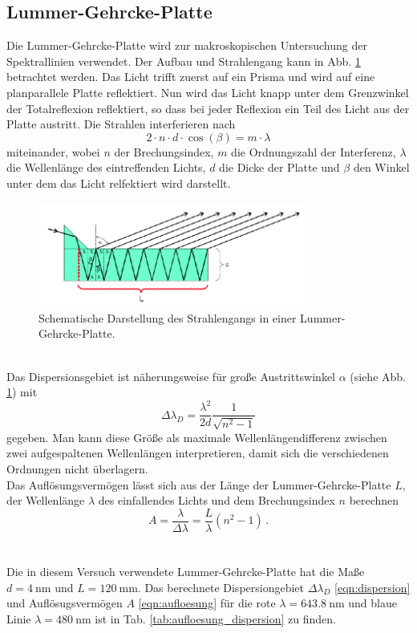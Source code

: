 \subsection{Lummer-Gehrcke-Platte}
Die Lummer-Gehrcke-Platte wird zur makroskopischen Untersuchung der Spektrallinien verwendet.
Der Aufbau und Strahlengang kann in Abb. \ref{fig:lummer} betrachtet werden.
Das Licht trifft zuerst auf ein Prisma und wird auf eine planparallele Platte reflektiert.
Nun wird das Licht knapp unter dem Grenzwinkel der Totalreflexion reflektiert, so dass bei jeder Reflexion ein Teil des Licht aus der Platte austritt.
Die Strahlen interferieren nach
\begin{equation*}
    2 \cdot n \cdot d \cdot \cos (\beta) = m \cdot \lambda
\end{equation*}
miteinander, wobei $n$ der Brechungsindex, $m$ die Ordnungszahl der Interferenz, $\lambda$ die Wellenlänge des eintreffenden Lichts, $d$ die Dicke der Platte und $\beta$ den Winkel unter dem das Licht relfektiert wird darstellt.
\begin{figure}
    \centering
    \includegraphics[width=0.8\textwidth]{content/data/lumer_gehrcke_platte.png}
    \caption{Schematische Darstellung des Strahlengangs in einer Lummer-Gehrcke-Platte. \cite[2]{anleitung}} %
    \label{fig:lummer}
\end{figure}
\\
Das Dispersionsgebiet ist näherungsweise für große Austrittswinkel $\alpha$ (siehe Abb. \ref{fig:lummer}) mit
\begin{equation}
    \Delta \lambda_D = \frac{\lambda^2}{2d} \frac{1}{\sqrt{n^2 -1}}
    \label{eqn:dispersion}
\end{equation}
gegeben.
Man kann diese Größe als maximale Wellenlängendifferenz zwischen zwei aufgespaltenen Wellenlängen interpretieren, damit sich die verschiedenen Ordnungen nicht überlagern.
\\
Das Auflösungsvermögen lässt sich aus der Länge der Lummer-Gehrcke-Platte $L$, der Wellenlänge $\lambda$ des einfallendes Lichts und dem Brechungsindex $n$ berechnen
\begin{equation}
    A = \frac{\lambda}{\Delta \lambda} = \frac{L}{\lambda} (n^2 - 1) \, .
    \label{eqn:aufloesung}
\end{equation}
\\
\\
Die in diesem Versuch verwendete Lummer-Gehrcke-Platte hat die Maße $d=\SI{4}{\nano\metre}$ und $L=\SI{120}{\milli\metre}$.
Das berechnete Dispersiongebiet $\Delta \lambda_D$ \eqref{eqn:dispersion} und Auflösugsvermögen $A$ \eqref{eqn:aufloesung} für die rote $\lambda = \SI{643,8}{\nano\metre}$ und blaue Linie $\lambda = \SI{480}{\nano\metre}$ ist in Tab. \ref{tab:aufloesung_dispersion} zu finden.

